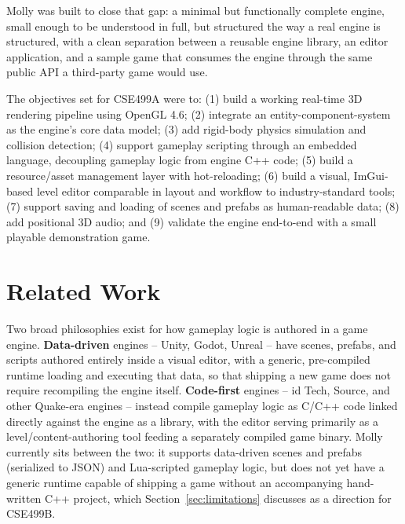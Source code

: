 \documentclass[conference]{IEEEtran}
\begin{document}
Molly was built to close that gap: a minimal but functionally complete
engine, small enough to be understood in full, but structured the way a
real engine is structured, with a clean separation between a reusable
engine library, an editor application, and a sample game that consumes
the engine through the same public API a third-party game would use.

The objectives set for CSE499A were to: (1) build a working real-time 3D
rendering pipeline using OpenGL 4.6; (2) integrate an
entity-component-system as the engine's core data model; (3) add
rigid-body physics simulation and collision detection; (4) support
gameplay scripting through an embedded language, decoupling gameplay
logic from engine C++ code; (5) build a resource/asset management layer
with hot-reloading; (6) build a visual, ImGui-based level editor
comparable in layout and workflow to industry-standard tools; (7)
support saving and loading of scenes and prefabs as human-readable data;
(8) add positional 3D audio; and (9) validate the engine end-to-end with
a small playable demonstration game.

\section{Related Work}
\label{sec:related}

Two broad philosophies exist for how gameplay logic is authored in a
game engine. \textbf{Data-driven} engines -- Unity, Godot, Unreal --
have scenes, prefabs, and scripts authored entirely inside a visual
editor, with a generic, pre-compiled runtime loading and executing that
data, so that shipping a new game does not require recompiling the
engine itself. \textbf{Code-first} engines -- id Tech, Source, and other
Quake-era engines -- instead compile gameplay logic as C/C++ code linked
directly against the engine as a library, with the editor serving
primarily as a level/content-authoring tool feeding a separately
compiled game binary. Molly currently sits between the two: it supports
data-driven scenes and prefabs (serialized to JSON) and Lua-scripted
gameplay logic, but does not yet have a generic runtime capable of
shipping a game without an accompanying hand-written C++ project, which
Section~\ref{sec:limitations} discusses as a direction for CSE499B.
\end{document}
